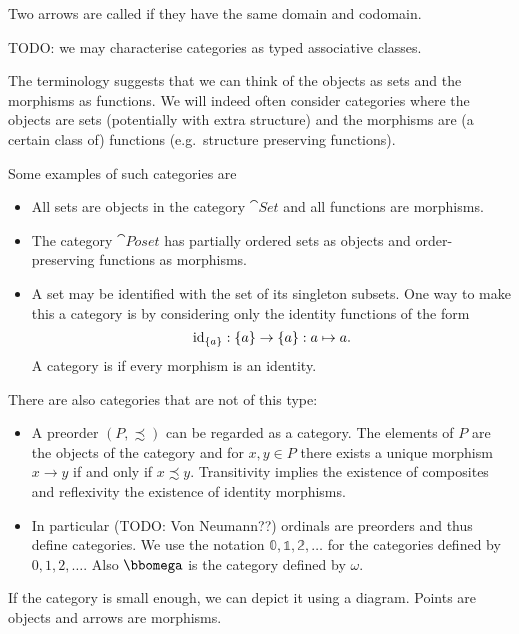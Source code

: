 Two arrows are called  if they have the same domain and codomain.

TODO: we may characterise categories as typed associative classes.

\begin{example}
The terminology suggests that we can think of the objects as sets and the morphisms as functions. We will indeed often consider categories where the objects are sets (potentially with extra structure) and the morphisms are (a certain class of) functions (e.g.\ structure preserving functions).

Some examples of such categories are
\begin{itemize}
\item All sets are objects in the category $\cat{Set}$ and all functions are morphisms.
\item The category $\cat{Poset}$ has partially ordered sets as objects and order-preserving functions as morphisms.
\item A set may be identified with the set of its singleton subsets. One way to make this a category is by considering only the identity functions of the form
\[ \operatorname{id}_{\{a\}}: \{a\} \to \{a\}: a\mapsto a. \]
A category is  if every morphism is an identity.
\end{itemize}

There are also categories that are not of this type:
\begin{itemize}
\item A preorder $(P, \precsim)$ can be regarded as a category. The elements of $P$ are the objects of the category and for $x,y\in P$ there exists a unique morphism $x\to y$ if and only if $x\precsim y$. Transitivity implies the existence of composites and reflexivity the existence of identity morphisms.
\item In particular (TODO: Von Neumann??) ordinals are preorders and thus define categories. We use the notation $\mathbb{0}, \mathbb{1}, \mathbb{2}, \ldots$ for the categories defined by $0,1,2,\ldots$. Also $\bbomega$ is the category defined by $\omega$.
\end{itemize}
\end{example}

If the category is small enough, we can depict it using a diagram. Points are objects and arrows are morphisms.

